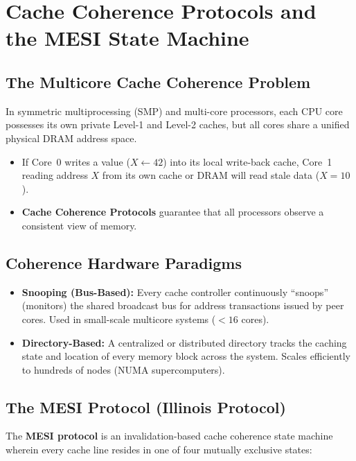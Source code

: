 \section{Cache Coherence Protocols and the MESI State Machine}
\label{sec:cache_coherence}

\subsection{The Multicore Cache Coherence Problem}
In symmetric multiprocessing (SMP) and multi-core processors, each CPU core possesses its own private Level-1 and Level-2 caches, but all cores share a unified physical DRAM address space.
\begin{itemize}
    \item If Core~0 writes a value ($X \leftarrow 42$) into its local write-back cache, Core~1 reading address $X$ from its own cache or DRAM will read stale data ($X = 10$).
    \item \textbf{Cache Coherence Protocols} guarantee that all processors observe a consistent view of memory.
\end{itemize}

\subsection{Coherence Hardware Paradigms}
\begin{itemize}
    \item \textbf{Snooping (Bus-Based):} Every cache controller continuously ``snoops'' (monitors) the shared broadcast bus for address transactions issued by peer cores. Used in small-scale multicore systems ($<16$ cores).
    \item \textbf{Directory-Based:} A centralized or distributed directory tracks the caching state and location of every memory block across the system. Scales efficiently to hundreds of nodes (NUMA supercomputers).
\end{itemize}

\subsection{The MESI Protocol (Illinois Protocol)}
The \textbf{MESI protocol} is an invalidation-based cache coherence state machine wherein every cache line resides in one of four mutually exclusive states:

